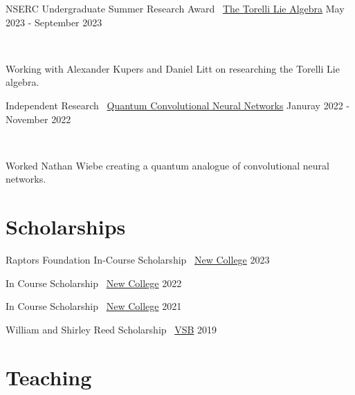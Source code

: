 \documentclass[]{style}
\begin{document}
\begin{entrylist}

\vspace{1mm}

\entry
{NSERC Undergraduate Summer Research Award \ {\normalfont \underline{The Torelli Lie Algebra}}}
{May 2023 - September 2023}
{ ~ \vspace{-2.5mm}

Working with Alexander Kupers and Daniel Litt on researching the Torelli Lie algebra.}

\entry
{Independent Research \ {\normalfont \underline{Quantum Convolutional Neural Networks}}}
{Januray 2022 - November 2022}
{ ~ \vspace{-2.5mm}

Worked Nathan Wiebe creating a quantum analogue of convolutional neural networks.}

\end{entrylist}

\section{Scholarships}

\begin{entrylist}

\vspace{-3mm}
\entry
{Raptors Foundation In-Course Scholarship \ {\normalfont \underline{New College}}}
{2023}
{}

\vspace{-3mm}
\entry
{In Course Scholarship \ {\normalfont \underline{New College}}}
{2022}
{}

\vspace{-3mm}
\entry
{In Course Scholarship \ {\normalfont \underline{New College}}}
{2021}
{}

\vspace{-3mm}
\entry
{William and Shirley Reed Scholarship \ {\normalfont \underline{VSB}}}
{2019}
{}

\end{entrylist}

\section{Teaching}
\end{document}
